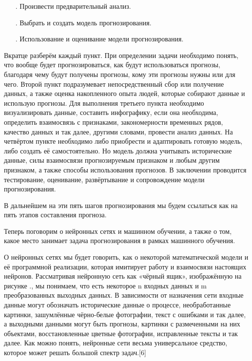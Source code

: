 {\begin{itemize}[leftmargin=2.15cm, labelwidth=0.65cm, labelsep=0.0cm]
		\item[\theitemcntr. ] Произвести предварительный анализ.
		\addtocounter{itemcntr}{1}
		
		\item[\theitemcntr. ] Выбрать и создать модель прогнозирования.
		\addtocounter{itemcntr}{1}
		
		\item[\theitemcntr. ] Использование и оценивание модели прогнозирования. 
		\addtocounter{itemcntr}{1}
		
		\setcounter{itemcntr}{1}
	\end{itemize}
	
	\par \redline Вкратце разберём каждый пункт. При определении задачи необходимо понять, что вообще будет прогнозироваться, как будут использоваться прогнозы, благодаря чему будут получены прогнозы, кому эти прогнозы нужны или для чего. Второй пункт подразумевает непосредственный сбор или получение данных, а также оценка накопленного опыта людей, которые собирают данные и использую прогнозы. Для выполнения третьего пункта необходимо визуализировать данные, составить инфографику, если она необходима, определить взаимосвязь с признаками, закономерности временных рядов, качество данных и так далее, другими словами, провести анализ данных. На четвёртом пункте необходимо либо приобрести и адаптировать готовую модель, либо создать её самостоятельно. Но модель должна учитывать исторические данные, силы взаимосвязи прогнозируемым признаком и любым другим признаком, а также способы использования прогнозов. В заключении проводится тестирование, оценивание, развёртывание и сопровождение модели прогнозирования. 
	
	\par \redline В дальнейшем на эти пять шагов прогнозирования мы будем ссылаться как на пять этапов составления прогноза.
	
	\par \redline Теперь поговорим о нейронных сетях и машинном обучении, а также о том, какое место занимает задача прогнозирования в рамках машинного обучения. 
	
	\par \redline О нейронных сетях мы будет говорить, как о некоторой математической модели и её программной реализации, которая имитирует работу и взаимосвязи настоящих нейронов.  Рассматривая нейронную сеть как «чёрный ящик», изображённую на рисунке \thechaptercntr .\theimagecntr \spc, мы понимаем, что есть некоторое n входных данных и m преобразованных выходных данных. В зависимости от назначения сети входные данные могут обозначать исторические данные о процессе, необработанные картинки, зашумлённые чёрно-белые фотографии, текст с ошибками и так далее, а выходными данными могут быть прогнозы, картинки с размеченными на них объектами, восстановленные цветные фотографии, исправленные тексты и так далее. Как можно понять, нейронные сети весьма универсальное средство, которое может решать большой спектр задач.[6] 
	
}
